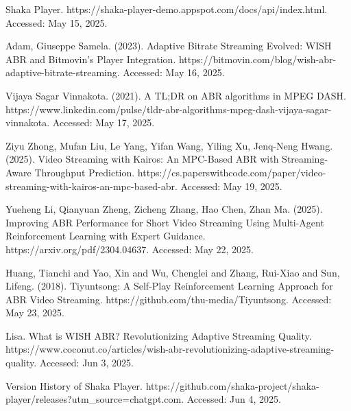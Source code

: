 \noindent [1] Shaka Player. https://shaka-player-demo.appspot.com/docs/api/index.html. Accessed: May 15, 2025.

\noindent [2] Adam, Giuseppe Samela. (2023). Adaptive Bitrate Streaming Evolved: WISH ABR and Bitmovin’s Player Integration. https://bitmovin.com/blog/wish-abr-adaptive-bitrate-streaming. Accessed: May 16, 2025.

\noindent [3] Vijaya Sagar Vinnakota. (2021). A TL;DR on ABR algorithms in MPEG DASH.
https://www.linkedin.com/pulse/tldr-abr-algorithms-mpeg-dash-vijaya-sagar-vinnakota. Accessed: May 17, 2025.

\noindent [4] Ziyu Zhong, Mufan Liu, Le Yang, Yifan Wang, Yiling Xu, Jenq-Neng Hwang. (2025). Video Streaming with Kairos: An MPC-Based ABR with Streaming-Aware Throughput Prediction. https://cs.paperswithcode.com/paper/video-streaming-with-kairos-an-mpc-based-abr. Accessed: May 19, 2025.

\noindent [5] Yueheng Li, Qianyuan Zheng, Zicheng Zhang, Hao Chen, Zhan Ma. (2025). Improving ABR Performance for Short Video Streaming Using
Multi-Agent Reinforcement Learning with Expert Guidance. https://arxiv.org/pdf/2304.04637. Accessed: May 22, 2025.

\noindent [6] Huang, Tianchi and Yao, Xin and Wu, Chenglei and Zhang, Rui-Xiao and Sun, Lifeng. (2018). Tiyuntsong: A Self-Play Reinforcement Learning Approach for ABR Video Streaming. https://github.com/thu-media/Tiyuntsong. Accessed: May 23, 2025.

\noindent [7] Lisa. What is WISH ABR? Revolutionizing Adaptive Streaming Quality.
https://www.coconut.co/articles/wish-abr-revolutionizing-adaptive-streaming-quality. Accessed: Jun 3, 2025.

\noindent [8] Version History of Shaka Player. https://github.com/shaka-project/shaka-player/releases?utm\_source=chatgpt.com. Accessed: Jun 4, 2025.